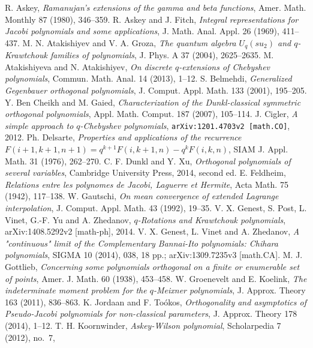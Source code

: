 \documentclass[twoside,11pt]{article}
\begin{document}
\begin{thebibliography}{999}
\label{sec_ref3}
%
%
R. Askey,
{\em Ramanujan's extensions of the gamma and beta functions},
Amer. Math. Monthly 87 (1980), 346--359.
%
R. Askey and J. Fitch,
{\em Integral representations for Jacobi polynomials and some applications},
J. Math. Anal. Appl. 26 (1969), 411--437.
%
M. N. Atakishiyev and V. A. Groza,
{\em The quantum algebra $U_q(su_2)$ and $q$-Krawtchouk families of
polynomials},
J. Phys. A 37 (2004), 2625--2635.
%
M. Atakishiyeva and N. Atakishiyev,
{\em On discrete $q$-extensions of Chebyshev polynomials},
Commun. Math. Anal. 14 (2013),  1--12.
%
S. Belmehdi,
{\em Generalized Gegenbauer orthogonal polynomials},
J. Comput. Appl. Math. 133 (2001), 195--205.
%
Y. Ben Cheikh and M. Gaied,
{\em Characterization of the Dunkl-classical symmetric orthogonal polynomials},
Appl. Math. Comput. 187 (2007), 105--114.
%
J. Cigler,
{\em A simple approach to $q$-Chebyshev polynomials},
{\tt arXiv:1201.4703v2 [math.CO]}, 2012.
%
Ph. Delsarte,
{\em Properties and applications of the recurrence
$F(i+1,k+1,n+1)=q^{k+1}F(i,k+1,n)-q^{k}F(i,k,n)$},
SIAM J. Appl. Math. 31 (1976), 262--270.
%
C. F. Dunkl and Y. Xu,
{\em Orthogonal polynomials of several variables},
Cambridge University Press, 2014, second ed.
%
E. Feldheim,
{\em Relations entre les polynomes de Jacobi, Laguerre et Hermite},
Acta Math. 75 (1942), 117--138.
%
W. Gautschi,
{\em On mean convergence of extended Lagrange interpolation},
J. Comput. Appl. Math. 43 (1992), 19--35.
%
V. X. Genest, S. Post, L. Vinet, G.-F. Yu and A. Zhedanov,
{\em $q$-Rotations and Krawtchouk polynomials},
arXiv:1408.5292v2 [math-ph], 2014.
%
V. X. Genest, L. Vinet and A. Zhedanov,
{\em A "continuous" limit of the Complementary Bannai-Ito polynomials:
Chihara polynomials},
SIGMA 10 (2014), 038, 18 pp.; arXiv:1309.7235v3 [math.CA].
%
M. J. Gottlieb,
{\em Concerning some polynomials orthogonal on a finite or enumerable set of  points},
Amer. J. Math. 60 (1938), 453--458.
%
W. Groenevelt and E. Koelink,
{\em The indeterminate moment problem for the $q$-Meixner polynomials},
J. Approx. Theory 163 (2011), 836--863.
%
K. Jordaan and F. To\'okos,
{\em Orthogonality and asymptotics of Pseudo-Jacobi polynomials for 
 non-classical parameters},
J. Approx. Theory 178 (2014), 1--12.
%
T. H. Koornwinder, {\em Askey-Wilson polynomial}, Scholarpedia 7 (2012), no.~7,

\end{thebibliography}
\end{document}
